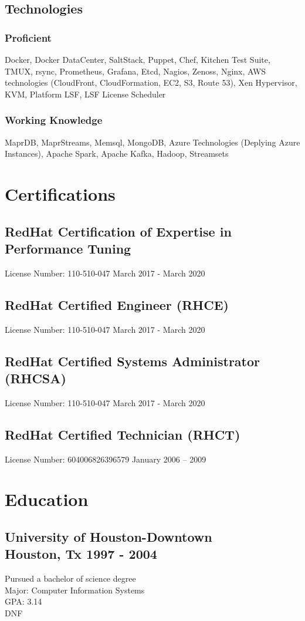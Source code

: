 \documentclass{article}
\begin{document}
  \subsection{Technologies}
    \subsubsection{Proficient}
      Docker, Docker DataCenter, SaltStack, Puppet, Chef, Kitchen Test Suite, TMUX, rsync, Prometheus, Grafana, Etcd, Nagios, Zenoss, Nginx, AWS technologies (CloudFront, CloudFormation, EC2, S3, Route 53), Xen Hypervisor, KVM, Platform LSF, LSF License Scheduler
    \subsubsection{Working Knowledge}
      MaprDB, MaprStreams, Memsql, MongoDB, Azure Technologies (Deplying Azure Instances), Apache Spark, Apache Kafka, Hadoop, Streamsets

\section{Certifications}
  \subsection{RedHat Certification of Expertise in Performance Tuning}
    License Number: 110-510-047 \hfill March 2017 - March 2020
  \subsection{RedHat Certified Engineer (RHCE)}
    License Number: 110-510-047 \hfill March 2017 - March 2020
  \subsection{RedHat Certified Systems Administrator (RHCSA)}
    License Number: 110-510-047 \hfill March 2017 - March 2020
  \subsection{RedHat Certified Technician (RHCT)}
    License Number: 604006826396579 \hfill January 2006 – 2009
    
  
\section{Education}
  \subsection{University of Houston-Downtown\\
    Houston, Tx \hfill 1997 - 2004
  }
    Pursued a bachelor of science degree\\
    Major: Computer Information Systems\\
    GPA: 3.14\\
    DNF\\
    
\end{document}
